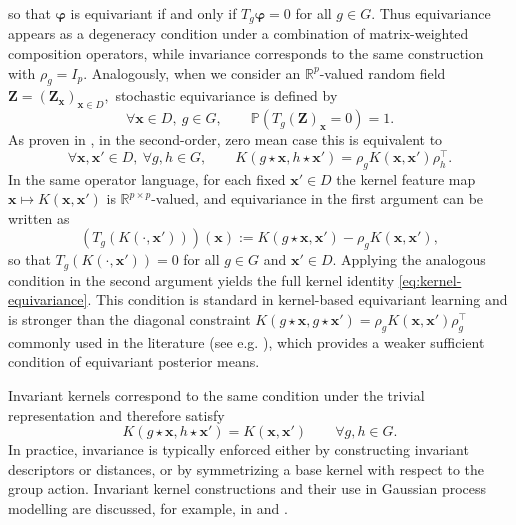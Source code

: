 \documentclass[11pt,a4paper]{article}
\newcommand{\bx}{\boldsymbol{x}}
\newcommand{\bZ}{\boldsymbol{Z}}
\begin{document}
so that $\boldsymbol{\varphi}$ is equivariant if and only if $T_g\boldsymbol{\varphi}=0$ for all $g\in G$.
Thus equivariance appears as a degeneracy condition under a combination of matrix-weighted composition operators, while invariance corresponds to the same construction with $\rho_g=I_p$.
Analogously, when we consider an $\mathbb{R}^p$-valued random field $\bZ = (\bZ_{\bx})_{\bx \in D},$ stochastic equivariance is defined by
\begin{equation*}
\forall \bx \in D, \ g \in G, \qquad \mathbb{P}\left(T_g\left(\bZ\right)_{\bx}=0\right)=1.\end{equation*} As proven in \citep{steinertintegration}, in the second-order, zero mean case this is equivalent to \begin{equation}\label{eq:kernel-equivariance} \forall \bx,\bx' \in D,\ \forall g,h \in G, \qquad K(g \star \bx, h \star \bx') = \rho_g K(\bx,\bx') \rho_h^\top .\end{equation}
In the same operator language, for each fixed $\bx'\in D$ the kernel feature map $\bx\mapsto K(\bx,\bx')$ is $\mathbb{R}^{p\times p}$-valued, and equivariance in the first argument can be written as
\begin{displaymath}(T_g(K(\cdot,\bx')))(\bx) := K(g\star\bx,\bx')-\rho_gK(\bx,\bx'),\end{displaymath}
so that $T_g(K(\cdot,\bx'))=0$ for all $g\in G$ and $\bx'\in D$.
Applying the analogous condition in the second argument yields the full kernel identity \eqref{eq:kernel-equivariance}.
This condition is standard in kernel-based equivariant learning \citep{JMLR:v8:reisert07a} and is stronger than the diagonal constraint $K(g \star \bx, g \star \bx') = \rho_g K(\bx,\bx') \rho_g^\top$ commonly used in the literature (see e.g. \citep{holderrieth2021equivariant}), which provides a weaker sufficient condition of equivariant posterior means.

Invariant kernels correspond to the same condition under the trivial representation and therefore satisfy
\begin{displaymath}K(g\star \bx, h\star \bx') = K(\bx,\bx') \qquad \forall g,h\in G.\end{displaymath}
In practice, invariance is typically enforced either by constructing invariant descriptors or distances, or by symmetrizing a base kernel with respect to the group action.
Invariant kernel constructions and their use in Gaussian process modelling are discussed, for example, in \cite{AFST_2012_6_21_3_501_0} and \cite{van2018learning}.
\end{document}
